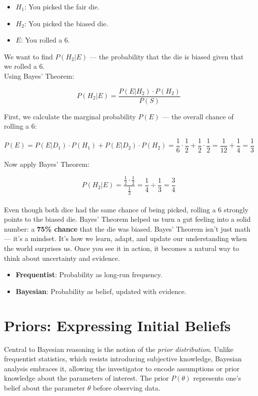\documentclass{book}
\begin{document}
\begin{itemize}
  \item $H_1$: You picked the fair die.
  \item $H_2$: You picked the biased die.
  \item $E$: You rolled a 6.
\end{itemize}

We want to find $P(H_2 | E)$ — the probability that the die is biased given that we rolled a 6.\\

Using Bayes’ Theorem:

\[
P(H_2 | E) = \frac{P(E | H_2) \cdot P(H_2)}{P(S)}
\]

First, we calculate the marginal probability $P(E)$ — the overall chance of rolling a 6:

\[
P(E) = P(E | D_1) \cdot P(H_1) + P(E | D_2) \cdot P(H_2) = \frac{1}{6} \cdot \frac{1}{2} + \frac{1}{2} \cdot \frac{1}{2}
= \frac{1}{12} + \frac{1}{4} = \frac{1}{3}
\]

Now apply Bayes' Theorem:

\[
P(H_2 | E) = \frac{\frac{1}{2} \cdot \frac{1}{2}}{\frac{1}{3}} = \frac{1}{4} \div \frac{1}{3} = \frac{3}{4}
\]\\

Even though both dice had the same chance of being picked, rolling a 6 strongly points to the biased die. Bayes’ Theorem helped us turn a gut feeling into a solid number: a \textbf{75\% chance} that the die was biased. Bayes’ Theorem isn’t just math — it’s a mindset. It’s how we learn, adapt, and update our understanding when the world surprises us. Once you see it in action, it becomes a natural way to think about uncertainty and evidence.

\begin{itemize}
    \item \textbf{Frequentist}: Probability as long-run frequency.
    \item \textbf{Bayesian}: Probability as belief, updated with evidence.
\end{itemize}

\section{Priors: Expressing Initial Beliefs}

Central to Bayesian reasoning is the notion of the \textit{prior distribution}. Unlike frequentist statistics, which resists introducing subjective knowledge, Bayesian analysis embraces it, allowing the investigator to encode assumptions or prior knowledge about the parameters of interest. The prior $P(\theta)$ represents one’s belief about the parameter $\theta$ before observing data.
\end{document}
